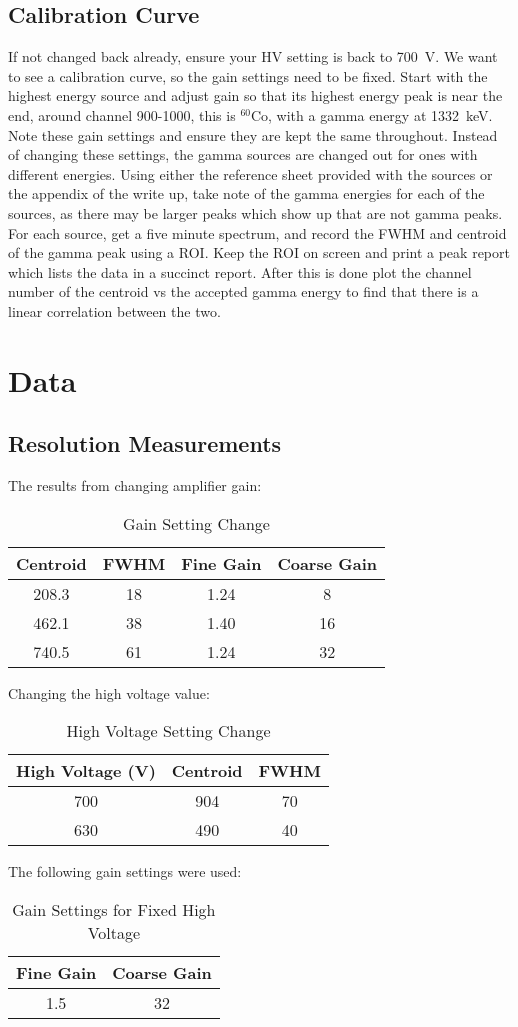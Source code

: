 \documentclass[letterpaper,12pt]{article}
\begin{document}
\subsection{Calibration Curve}
If not changed back already, ensure your HV setting is back to \SI{700}{\volt}. We want to see a calibration curve, so the gain settings need to be fixed. Start with the highest energy source and adjust gain so that its highest energy peak is near the end, around channel 900-1000, this is $^{60}$Co, with a gamma energy at \SI{1332}{\keV}. Note these gain settings and ensure they are kept the same throughout. Instead of changing these settings, the gamma sources are changed out for ones with different energies. Using either the reference sheet provided with the sources or the appendix of the write up, take note of the gamma energies for each of the sources, as there may be larger peaks which show up that are not gamma peaks. For each source, get a five minute spectrum, and record the FWHM and centroid of the gamma peak using a ROI. Keep the ROI on screen and print a peak report which lists the data in a succinct report. After this is done plot the channel number of the centroid vs the accepted gamma energy to find that there is a linear correlation between the two. 
\newpage
\section{Data}

\subsection{Resolution Measurements}
The results from changing amplifier gain:
\begin{table}[H]
  \centering
  \begin{tabular}{c|c|c|c}
    Centroid & FWHM & Fine Gain & Coarse Gain \\\hline
    208.3    & 18   & 1.24      & 8 \\
    462.1    & 38   & 1.40      & 16 \\
    740.5    & 61   & 1.24      & 32
  \end{tabular}
  \caption{Gain Setting Change}
  \label{tab:2}
\end{table}
Changing the high voltage value:
\begin{table}[H]
  \centering
  \begin{tabular}{c|c|c}
    High Voltage (\si{\volt}) & Centroid & FWHM \\\hline
    700 & 904 & 70 \\
    630 & 490 & 40
  \end{tabular}
  \caption{High Voltage Setting Change}
  \label{tab:3}
\end{table}
The following gain settings were used:
\begin{table}[H]
  \centering
  \begin{tabular}{c|c}
    Fine Gain & Coarse Gain \\\hline
    1.5 & 32
  \end{tabular}
  \caption{Gain Settings for Fixed High Voltage}
  \label{tab:4}
\end{table}
\end{document}
